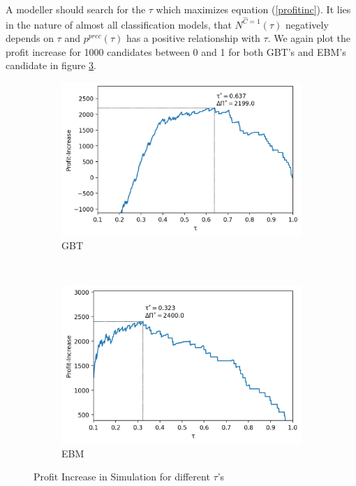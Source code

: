 \documentclass[12pt,titlepage]{article}
\begin{document}
\noindent
A modeller should search for the $\tau$ which maximizes equation (\ref{profitinc}). It lies in the nature of almost all classification models, that $N^{\hat{C}=1}(\tau)$ negatively depends on $\tau$ and $p^{prec}(\tau)$ has a positive relationship with $\tau$. We again plot the profit increase for 1000 candidates between 0 and 1 for both GBT's and EBM's candidate in figure \ref{fig:prof_increase_plot}.
\begin{figure}[H]
    \centering
    \begin{subfigure}{.7\textwidth}
      \includegraphics[width=1\linewidth]{gbt_prof_increase_plot.png}
      \caption{GBT}
      \label{fig:gbt_prof_increase_plot}
    \end{subfigure} \\
    \begin{subfigure}{.7\textwidth}
      \includegraphics[width=1\linewidth]{ebm_prof_increase_plot.png}
      \caption{EBM}
      \label{fig:ebm_prof_increase_plot}
    \end{subfigure}
    \caption{Profit Increase in Simulation for different $\tau$'s}
\label{fig:prof_increase_plot}
\end{figure}
\end{document}
